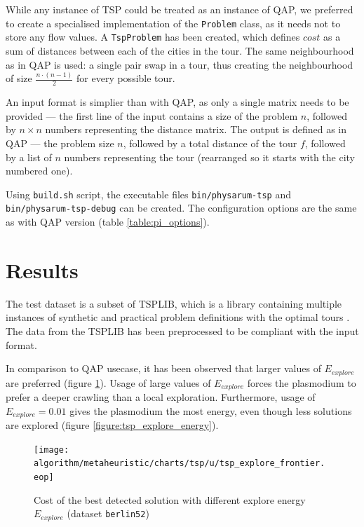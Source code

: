 \documentclass[english,a4paper,twoside]{ppfcmthesis}
\begin{document}
While any instance of TSP could be treated as an instance of QAP, we preferred to create a specialised implementation of the \texttt{Problem} class, as it needs not to store any flow values. A \texttt{TspProblem} has been created, which defines $cost$ as a sum of distances between each of the cities in the tour. The same neighbourhood as in QAP is used: a single pair swap in a tour, thus creating the neighbourhood of size $\frac{n\cdot(n-1)}{2}$ for every possible tour.

An input format is simplier than with QAP, as only a single matrix needs to be provided --- the first line of the input contains a size of the problem $n$, followed by $n{\times}n$ numbers representing the distance matrix. The output is defined as in QAP --- the problem size $n$, followed by a total distance of the tour $f$, followed by a list of $n$ numbers representing the tour (rearranged so it starts with the city numbered one).

Using \texttt{build.sh} script, the executable files \texttt{bin/physarum-tsp} and \texttt{bin/physarum-tsp-debug} can be created. The configuration options are the same as with QAP version (table \ref{table:pi_options}).


\section*{Results}

The test dataset is a subset of TSPLIB, which is a library containing multiple instances of synthetic and practical problem definitions with the optimal tours \cite{reinhelt2014tsplib}. The data from the TSPLIB has been preprocessed to be compliant with the input format.

In comparison to QAP usecase, it has been observed that larger values of $E_{explore}$ are preferred (figure \ref{figure:tsp_explore_frontier}). Usage of large values of $E_{explore}$ forces the plasmodium to prefer a deeper crawling than a local exploration. Furthermore, usage of $E_{explore}=0.01$ gives the plasmodium the most energy, even though less solutions are explored (figure \ref{figure:tsp_explore_energy}).

\begin{figure}
  \centering

  \texttt{[image: algorithm/metaheuristic/charts/tsp/u/tsp\_explore\_frontier.\\eop]}

  \caption{Cost of the best detected solution with different explore energy $E_{explore}$ (dataset \texttt{berlin52})}
  \label{figure:tsp_explore_frontier}
\end{figure}
\end{document}
